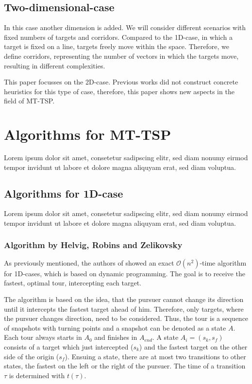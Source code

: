 \documentclass{acm_proc_article-sp}
\begin{document}

\subsection{Two-dimensional-case}

In this case another dimension is added. We will consider different scenarios with fixed numbers of targets and corridors. Compared to the 1D-case, in which a target is fixed on a line, targets freely move within the space. Therefore, we define corridors, representing the number of vectors in which the targets move, resulting in different complexities.

This paper focusses on the 2D-case. Previous works did not construct concrete heuristics for this type of case, therefore, this paper shows new aspects in the field of MT-TSP.



\section{Algorithms for MT-TSP}
Lorem ipsum dolor sit amet, consetetur sadipscing elitr, sed diam nonumy eirmod tempor invidunt ut labore et dolore magna aliquyam erat, sed diam voluptua.

\subsection{Algorithms for 1D-case}
Lorem ipsum dolor sit amet, consetetur sadipscing elitr, sed diam nonumy eirmod tempor invidunt ut labore et dolore magna aliquyam erat, sed diam voluptua.


\subsubsection{Algorithm by Helvig, Robins and Zelikovsky}
As previously mentioned, the authors of \cite{helvig} showed an exact $\mathcal{O}(n^2)$-time algorithm for 1D-cases, which is based on dynamic programming. The goal is to receive the fastest, optimal tour, intercepting each target. 

The algorithm is based on the idea, that the pursuer cannot change its direction until it intercepts the fastest target ahead of him. Therefore, only targets, where the pursuer changes direction, need to be considered. Thus, the tour is a sequence of snapshots with turning points and a snapshot can be denoted as a state $A$. Each tour always starts in $A_0$ and finishes in $A_{end}$. A state $A_i=(s_k, s_f)$ consists of a target which just intercepted ($s_k$) and the fastest target on the other side of the origin ($s_f$). Ensuing a state, there are at most two transitions to other states, the fastest on the left or the right of the pursuer. The time of a transition $\tau$ is determined with $t(\tau)$. 
\end{document}
